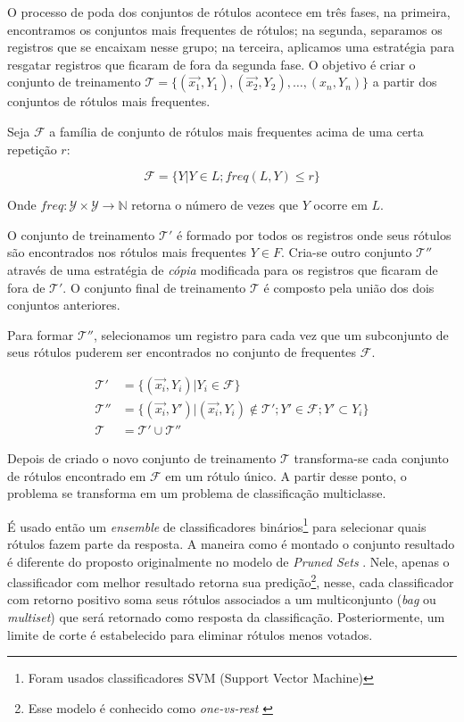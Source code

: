 \documentclass[runningheads,a4paper]{llncs}
\begin{document}
O processo de poda dos conjuntos de rótulos acontece em três fases, na primeira, encontramos os conjuntos mais frequentes de rótulos; na segunda, separamos os registros que se encaixam nesse grupo; na terceira, aplicamos uma estratégia para resgatar registros que ficaram de fora da segunda fase. O objetivo é criar o conjunto de treinamento $\mathcal{T} = \{(\vec{x_1},Y_1), (\vec{x_2}, Y_2), \dots, (x_n, Y_n)\}$ a partir dos conjuntos de rótulos mais frequentes.

Seja $\mathcal{F}$ a família de conjunto de rótulos mais frequentes acima de uma certa repetição $r$:

$$
\mathcal{F} = \{Y | Y \in L; freq(L, Y) \leq r\}
$$

Onde $freq : \mathcal{Y} \times \mathcal{Y} \to \mathbb{N}$ retorna o número de vezes que $Y$ ocorre em $L$.

O conjunto de treinamento $\mathcal{T'}$ é formado por todos os registros onde seus rótulos são encontrados nos rótulos mais frequentes $Y \in F$. Cria-se outro conjunto $\mathcal{T''}$ através de uma estratégia de \textit{cópia} modificada para os registros que ficaram de fora de $\mathcal{T'}$. O conjunto final de treinamento $\mathcal{T}$ é composto pela união dos dois conjuntos anteriores.

Para formar $\mathcal{T''}$, selecionamos um registro para cada vez que um subconjunto de seus rótulos puderem ser encontrados no conjunto de frequentes $\mathcal{F}$.

\begin{align*}
\mathcal{T'} &= \{(\vec{x_i}, Y_i) | Y_i \in \mathcal{F}\} \\
\mathcal{T''} &=  \{(\vec{x_i}, Y') | (\vec{x_i}, Y_i) \notin \mathcal{T'}; Y' \in \mathcal{F}; Y' \subset Y_i \} \\
\mathcal{T} &=  \mathcal{T'} \cup \mathcal{T''}
\end{align*}

Depois de criado o novo conjunto de treinamento $\mathcal{T}$ transforma-se cada conjunto de rótulos encontrado em $\mathcal{F}$ em um rótulo único. A partir desse ponto, o problema se transforma em um problema de classificação multiclasse.

É usado então um \textit{ensemble} de classificadores binários\footnote{Foram usados classificadores SVM (Support Vector Machine)} para selecionar quais rótulos fazem parte da resposta. A maneira como é montado o conjunto resultado é diferente do proposto originalmente no modelo de \textit{Pruned Sets} \cite{Read2008-bt}. Nele, apenas o classificador com melhor resultado retorna sua predição\footnote{Esse modelo é conhecido como \textit{one-vs-rest} \cite{Bishop2006-vm}}, nesse, cada classificador com retorno positivo soma seus rótulos associados a um multiconjunto (\textit{bag} ou \textit{multiset}) que será retornado como resposta da classificação. Posteriormente, um limite de corte é estabelecido para eliminar rótulos menos votados.
\end{document}
